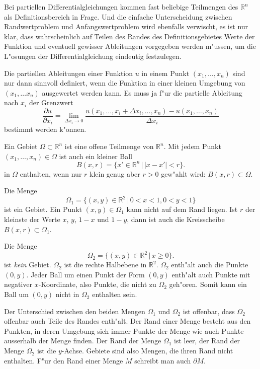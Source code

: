 Bei partiellen Differentialgleichungen kommen fast
beliebige Teilmengen des $\mathbb R^n$ als Definitionsbereich
in Frage. Und die einfache Unterscheidung zwischen Randwertproblem
und Anfangswertproblem wird ebenfalls verwischt, es ist nur klar,
dass wahrscheinlich auf Teilen des Randes des Definitionsgebietes
Werte der Funktion und eventuell gewisser Ableitungen
vorgegeben werden m"ussen, um die L"osungen der Differentialgleichung
eindeutig festzulegen.

Die partiellen Ableitungen einer Funktion $u$
in einem Punkt $(x_1,\dots,x_n)$ 
sind nur dann sinnvoll definiert, wenn die Funktion in einer 
kleinen Umgebung von $(x_1,\dots x_n)$ ausgewertet werden kann.
Es muss ja f"ur die partielle Ableitung nach $x_i$ der Grenzwert
\[
\frac{\partial u}{\partial x_i}=
\lim_{\Delta x_i\to 0}\frac{u(x_1,\dots,x_i+\Delta x_i, \dots ,x_n)-u(x_1,\dots,x_n)}{\Delta x_i}
\]
bestimmt werden k"onnen.

\begin{definition}
Ein Gebiet $\Omega\subset \mathbb R^n$ ist eine offene Teilmenge
von $\mathbb R^n$. Mit jedem Punkt $(x_1,\dots,x_n)\in\Omega$ ist
auch ein kleiner Ball
\[
B(x, r)=\{x'\in\mathbb R^n\,|\,|x-x'|<r\}.
\]
in $\Omega$ enthalten, wenn nur $r$ klein genug aber $r>0$ gew"ahlt wird:
$B(x,r)\subset\Omega$.
\end{definition}

\begin{beispiel}
Die Menge 
\[
\Omega_1=\{ (x,y)\in\mathbb R^2\,|\, 0 < x < 1, 0<y<1\}
\]
ist ein Gebiet. Ein Punkt $(x,y)\in\Omega_1$ kann nicht auf dem
Rand liegen. Ist $r$ der kleinste der Werte $x$, $y$, $1-x$ und $1-y$,
dann ist auch die Kreisscheibe $B(x,r)\subset\Omega_1$.
\end{beispiel}

\begin{beispiel}
Die Menge 
\[
\Omega_2 = \{ (x,y)\in\mathbb R^2\,|\, x\ge 0\}.
\]
ist {\it kein} Gebiet. $\Omega_2$ ist die rechte Halbebene in $\mathbb R^2$.
$\Omega_2$ enth"alt auch die Punkte $(0,y)$. Jeder Ball um einen
Punkt der Form $(0,y)$ enth"alt auch Punkte mit negativer
$x$-Koordinate, also Punkte, die nicht zu $\Omega_2$ geh"oren.
Somit kann ein Ball um $(0,y)$ nicht in $\Omega_2$ enthalten sein.
\end{beispiel}

Der Unterschied zwischen den beiden Mengen $\Omega_1$ und $\Omega_2$
ist offenbar, dass $\Omega_2$ offenbar auch Teile des Randes
enth"alt. Der Rand einer Menge besteht aus den Punkten, in deren
Umgebung sich immer Punkte der Menge wie auch Punkte ausserhalb
der Menge finden. Der Rand der Menge $\Omega_1$ ist leer, der Rand
der Menge $\Omega_2$ ist die $y$-Achse. Gebiete sind also Mengen,
die ihren Rand nicht enthalten. F"ur den Rand einer Menge $M$
schreibt man auch $\partial M$.

